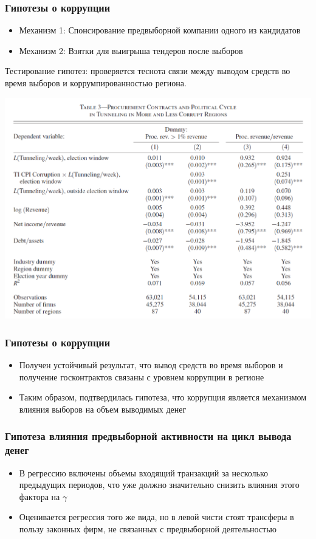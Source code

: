 \begin{frame}
\frametitle{Гипотезы о коррупции}
\begin{itemize}
	\item Механизм 1: Спонсирование предвыборной компании одного из кандидатов
	\item Механизм 2: Взятки для выигрыша тендеров после выборов 
\end{itemize}
Тестирование гипотез: проверяется теснота связи между выводом средств во время выборов и коррумпированностью региона. 
\begin{center}
\includegraphics[scale=0.17]{images/kek4}
\end{center}
\end{frame}

\begin{frame}
\frametitle{Гипотезы о коррупции}
\begin{itemize}
	\item Получен устойчивый результат, что вывод средств во время выборов и получение госконтрактов связаны с уровнем коррупции в регионе
	\item Таким образом, подтвердилась гипотеза, что коррупция является механизмом влияния выборов на объем выводимых денег  
\end{itemize}
\end{frame}

\begin{frame}
\frametitle{Гипотеза влияния предвыборной активности на цикл вывода денег}
\begin{itemize}
	\item В регрессию включены объемы входящий транзакций за несколько предыдущих периодов, что уже должно значительно снизить влияния этого фактора на $\gamma$
	\item Оценивается регрессия того же вида, но в левой чисти стоят трансферы в пользу законных фирм, не связанных с предвыборной деятельностью
\end{itemize}
\end{frame}

